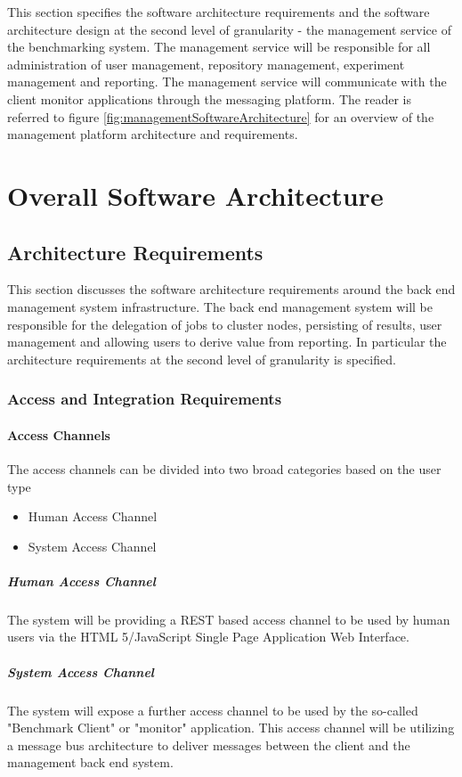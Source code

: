 This section specifies the software architecture requirements and the software
architecture design at the second level of granularity - the management service
of the benchmarking system. The management service will be responsible for all
administration of user management, repository management, experiment management
and reporting. The management service will communicate with the client monitor 
applications through the messaging platform. The reader is referred to
figure \ref{fig:managementSoftwareArchitecture} for an overview of the
management platform architecture and requirements. 

\section{Overall Software Architecture}
\subsection{Architecture Requirements}
This section discusses the software architecture requirements around the
back end management system infrastructure. The back end management system will be
responsible for the delegation of jobs to cluster nodes, persisting of results,
user management and allowing users to derive value from reporting. In particular
the architecture requirements at the second level of granularity is specified.

\subsubsection{Access and Integration Requirements}
\label{sec:accessIntegrationRequirementsManagementSystem}
\paragraph*{Access Channels}
The access channels can be divided into two broad categories based on the user type
\begin{itemize}
	\item Human Access Channel
	\item System Access Channel
\end{itemize}

\subparagraph*{Human Access Channel}
\label{sec:humanAccessChannelManagementSystem}
The system will be providing a REST based access channel to be used by human
users via the HTML 5/JavaScript Single Page Application Web Interface.

\subparagraph*{System Access Channel}
The system will expose a further access channel to be used by the so-called
"Benchmark Client" or "monitor" application. This access channel will be
utilizing a message bus architecture to deliver messages between the client
and the management back end system.

